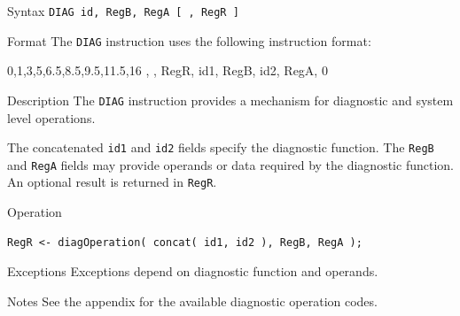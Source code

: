 %
%
\pagebreak
{}

\begin{iPageDescEntry}{Syntax}
\texttt{DIAG id, RegB, RegA [ , RegR ]}
\end{iPageDescEntry}

\begin{iPageDescEntry}{Format}
The \texttt{DIAG} instruction uses the following instruction format: \\

\begin{flushleft}
\drawInstrFormat
    {0,1,3,5,6.5,8.5,9.5,11.5,16}
    {\OpCodeGrpSYS, \OpCodeDIAG, RegR, id1, RegB, id2, RegA, 0}
\end{flushleft}
\end{iPageDescEntry}

\begin{iPageDescEntry}{Description}
The \texttt{DIAG} instruction provides a mechanism for diagnostic and system level operations.  

The concatenated \texttt{id1} and \texttt{id2} fields specify the diagnostic function. The \texttt{RegB} and \texttt{RegA} fields may provide operands or data required by the diagnostic function. An optional result is returned in \texttt{RegR}.
 
\end{iPageDescEntry}

\begin{iPageDescOpEntry}{Operation}
\begin{lstlisting}[style=iPageOpStyle]
RegR <- diagOperation( concat( id1, id2 ), RegB, RegA );
\end{lstlisting}
\end{iPageDescOpEntry}

\begin{iPageDescEntry}{Exceptions}
Exceptions depend on diagnostic function and operands.
\end{iPageDescEntry}

\begin{iPageDescEntry}{Notes}
See the appendix for the available diagnostic operation codes.
\end{iPageDescEntry}
